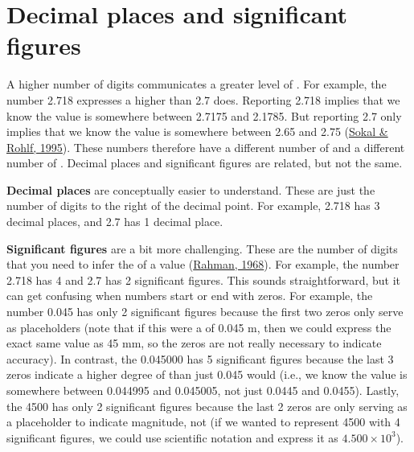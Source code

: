 \documentclass[
  openany]{krantz}
\begin{document}
\hypertarget{decimal-places-and-significant-figures}{%
\section{Decimal places and significant figures}\label{decimal-places-and-significant-figures}}

A higher number of digits communicates a greater level of .
For example, the number 2.718 expresses a higher  than 2.7 does.
Reporting 2.718 implies that we know the value is somewhere between 2.7175 and 2.1785.
But reporting 2.7 only implies that we know the value is somewhere between 2.65 and 2.75 (\protect\hyperlink{ref-Sokal1995}{Sokal \& Rohlf, 1995}).
These numbers therefore have a different number of \emph{} and a different number of \emph{}.
Decimal places and significant figures are related, but not the same.

\textbf{Decimal places} are conceptually easier to understand. These are just the number of digits to the right of the decimal point. For example, 2.718 has 3 decimal places, and 2.7 has 1 decimal place.

\textbf{Significant figures} are a bit more challenging.
These are the number of digits that you need to infer the  of a value (\protect\hyperlink{ref-Rahman1968}{Rahman, 1968}).
For example, the number 2.718 has 4  and 2.7 has 2 significant figures. This sounds straightforward, but it can get confusing when numbers start or end with zeros.
For example, the number 0.045 has only 2 significant figures because the first two zeros only serve as placeholders (note that if this were a  of 0.045 m, then we could express the exact same value as 45 mm, so the zeros are not really necessary to indicate  accuracy).
In contrast, the  0.045000 has 5 significant figures because the last 3 zeros indicate a higher degree of  than just 0.045 would (i.e., we know the value is somewhere between 0.044995 and 0.045005, not just 0.0445 and 0.0455).
Lastly, the  4500 has only 2 significant figures because the last 2 zeros are only serving as a placeholder to indicate magnitude, not  (if we wanted to represent 4500 with 4 significant figures, we could use scientific notation and express it as \(4.500 \times 10^3\)).
\end{document}
